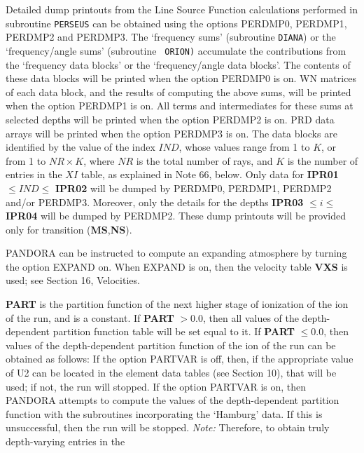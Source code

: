 Detailed dump printouts from the Line Source Function calculations
performed in subroutine {\tt PERSEUS} can be
obtained using the options PERDMP0, PERDMP1, \break PERDMP2 and 
PERDMP3. \np
The `frequency sums'
(subroutine {\tt DIANA}) or the `frequency/angle sums' (subroutine {\tt 
ORION)} accumulate the contributions from the `frequency data blocks' or the
`frequency/angle data blocks'. The contents of these data blocks will be printed
when the option PERDMP0 is on. \np
WN matrices of each data block, and the results
of computing the above sums, will be printed when the option PERDMP1 is on. \np
All terms and intermediates for these sums at selected depths will be printed
when the option PERDMP2 is on. \np
PRD data arrays will be printed when the option PERDMP3 is on. \np
The data blocks are identified by the value of the index $IND$, whose values
range from 1 to $K$, or from 1 to $NR \times K$, where $NR$ is the total number
of rays, and $K$ is the number of entries in the $XI$ table, as explained
in Note 66, below. Only data for {\bf IPR01} $ \leq IND \leq $ {\bf IPR02} 
will be dumped by PERDMP0, PERDMP1, PERDMP2 and/or PERDMP3. Moreover,
only the details for the depths \break
{\bf IPR03} $ \leq i \leq $ {\bf IPR04} will be dumped by PERDMP2. \np
These dump printouts will be provided only for transition ({\bf MS},{\bf NS}).
\blankline
\blankline
\centerline{}
\space \noindent
PANDORA can be instructed to compute an expanding atmosphere by turning
the option EXPAND on. When EXPAND is on, then the velocity table {\bf VXS}
is used; see Section 16, Velocities.
\ej
\centerline{}
\space \noindent
{\bf PART} is the partition function of the next higher stage of ionization
of the ion of the run, and is a constant. \np
If {\bf PART} $> 0.0$, then all values
of the depth-dependent partition function table will be set equal to it. \np
If {\bf PART} $ \leq 0.0$, then values of the depth-dependent partition function
of the ion of the run can be obtained as follows: \np
If the option PARTVAR is off, then, if the appropriate value of U2 can be
located in the element data tables (see Section 10), that will be used; if not,
the run will stopped. \np
If the option PARTVAR is on, then PANDORA attempts to compute the values
of the depth-dependent partition function with the subroutines incorporating
the `Hamburg' data. If this is unsuccessful, then the run will be stopped. \np
{\it Note:} 
Therefore, to obtain truly depth-varying entries in the
